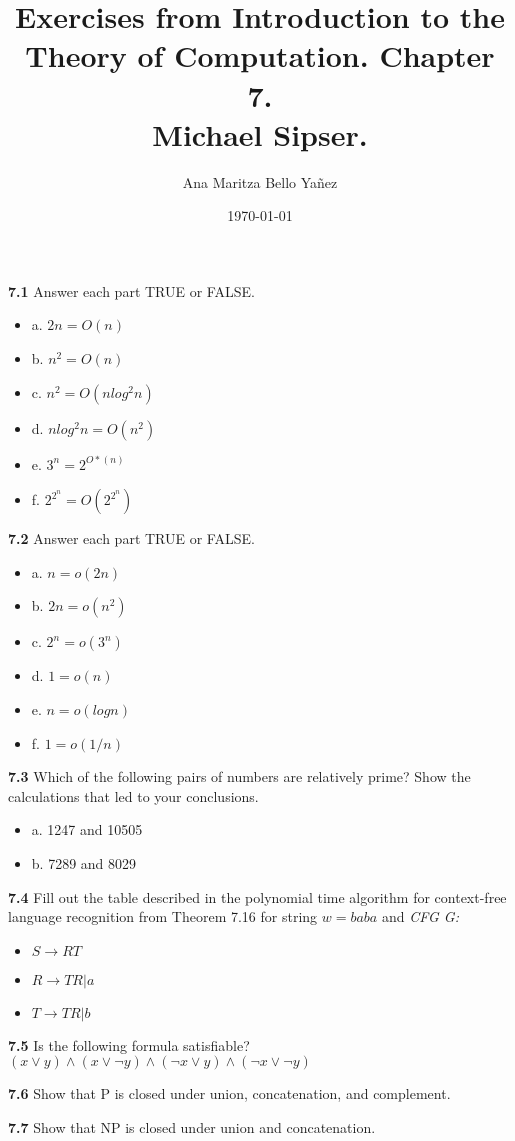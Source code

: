 \documentclass{article}
\title{Exercises from Introduction to the Theory of Computation. Chapter 7. \\ Michael Sipser.}
\author{Ana Maritza Bello Yañez}
\date{\today}
\begin{document}
\maketitle

\textbf{7.1} Answer each part TRUE or FALSE.
\begin{itemize}
    \item a. $2n = O(n)$
    \item b. $n^2 = O(n)$
    \item c. $n^2 = O(n log^2 n)$
    \item d. $n log^2 n = O(n^2)$
    \item e. $3^n = 2^{O*(n)}$
    \item f. $2^{2^n} = O(2^{2^n})$
\end{itemize}

\textbf{7.2} Answer each part TRUE or FALSE.
    \begin{itemize}
        \item a. $n = o(2n)$
        \item b. $2n = o(n^2)$
        \item c. $2^n = o(3^n)$
        \item d. $1 = o(n)$
        \item e. $n = o(log n)$
        \item f. $1 = o(1/n)$
    \end{itemize}

\textbf{7.3} Which of the following pairs of numbers are relatively prime? Show
the calculations that led to your conclusions.

\begin{itemize}
    \item a. 1247 and 10505
    \item b. 7289 and 8029
\end{itemize}

\textbf{7.4} Fill out the table described in the polynomial time algorithm for
context-free language recognition from Theorem 7.16 for string $w = baba$ and
\textit{CFG G:}

\begin{itemize}
    \item $S \rightarrow RT$
    \item $R \rightarrow TR|a$
    \item $T \rightarrow TR|b$
\end{itemize}


\textbf{7.5} Is the following formula satisfiable?
$ (x \lor y) \land (x \lor \neg{y}) \land (\neg{x} \lor y) \land (\neg{x} \lor \neg{y}) $

\textbf{7.6} Show that P is closed under union, concatenation, and complement.


\textbf{7.7} Show that NP is closed under union and concatenation.
\end{document}
